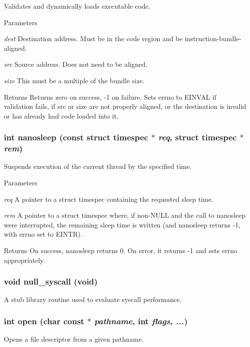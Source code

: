 \label{group__syscalls_ga0767bb3577482bd018fad742f12fd35a}
Validates and dynamically loads executable code. 
\begin{DoxyParams}{Parameters}
\item[{\em dest}]Destination address. Must be in the code region and be instruction-\/bundle-\/aligned. \item[{\em src}]Source address. Does not need to be aligned. \item[{\em size}]This must be a multiple of the bundle size. \end{DoxyParams}
\begin{DoxyReturn}{Returns}
Returns zero on success, -\/1 on failure. Sets errno to EINVAL if validation fails, if src or size are not properly aligned, or the destination is invalid or has already had code loaded into it. 
\end{DoxyReturn}
\hypertarget{group__syscalls_ga1b63fa141b202a0b01cfef8421aa48d6}{
\subsubsection[{nanosleep}]{\setlength{\rightskip}{0pt plus 5cm}int nanosleep (const struct timespec $\ast$ {\em req}, \/  struct timespec $\ast$ {\em rem})}}
\label{group__syscalls_ga1b63fa141b202a0b01cfef8421aa48d6}
Suspends execution of the current thread by the specified time. 
\begin{DoxyParams}{Parameters}
\item[{\em req}]A pointer to a struct timespec containing the requested sleep time. \item[{\em rem}]A pointer to a struct timespec where, if non-\/NULL and the call to nanosleep were interrupted, the remaining sleep time is written (and nanosleep returns -\/1, with errno set to EINTR). \end{DoxyParams}
\begin{DoxyReturn}{Returns}
On success, nanosleep returns 0. On error, it returns -\/1 and sets errno appropriately. 
\end{DoxyReturn}
\hypertarget{group__syscalls_ga4430741655c04cf7d609fd935f52a28a}{
\subsubsection[{null\_\-syscall}]{\setlength{\rightskip}{0pt plus 5cm}void null\_\-syscall (void)}}
\label{group__syscalls_ga4430741655c04cf7d609fd935f52a28a}
A stub library routine used to evaluate syscall performance. \hypertarget{group__syscalls_ga0bc065c5cd7178fb88c67a4d02f61deb}{
\subsubsection[{open}]{\setlength{\rightskip}{0pt plus 5cm}int open (char const $\ast$ {\em pathname}, \/  int {\em flags}, \/   {\em ...})}}
\label{group__syscalls_ga0bc065c5cd7178fb88c67a4d02f61deb}
Opens a file descriptor from a given pathname.


